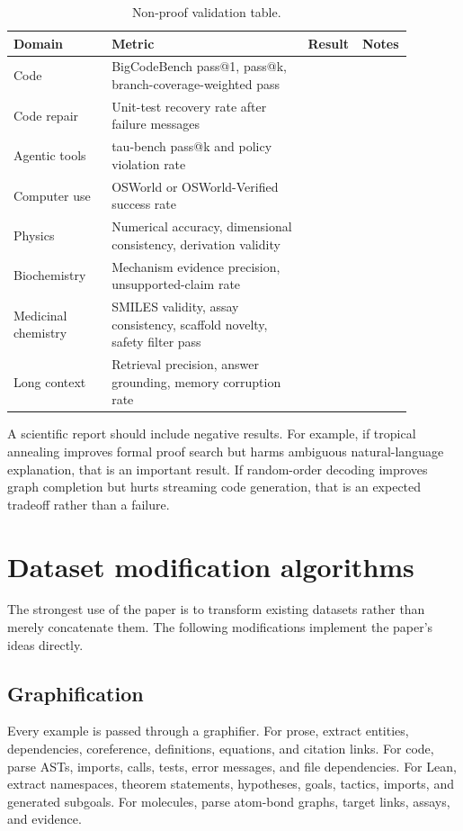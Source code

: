 \documentclass[11pt]{article}
\newcommand{\1}{\mathbf{1}}
\begin{document}
\begin{longtable}{@{}p{0.24\linewidth}p{0.48\linewidth}p{0.08\linewidth}p{0.08\linewidth}@{}}
\caption{Non-proof validation table.}\label{tab:nonproof-empty}\\
\toprule
Domain & Metric & Result & Notes\\
\midrule
Code & BigCodeBench pass@1, pass@k, branch-coverage-weighted pass & & \\
Code repair & Unit-test recovery rate after failure messages & & \\
Agentic tools & tau-bench pass@k and policy violation rate & & \\
Computer use & OSWorld or OSWorld-Verified success rate & & \\
Physics & Numerical accuracy, dimensional consistency, derivation validity & & \\
Biochemistry & Mechanism evidence precision, unsupported-claim rate & & \\
Medicinal chemistry & SMILES validity, assay consistency, scaffold novelty, safety filter pass & & \\
Long context & Retrieval precision, answer grounding, memory corruption rate & & \\
\bottomrule
\end{longtable}

A scientific report should include negative results. For example, if tropical annealing improves formal proof search but harms ambiguous natural-language explanation, that is an important result. If random-order decoding improves graph completion but hurts streaming code generation, that is an expected tradeoff rather than a failure.

\section{Dataset modification algorithms}
\label{sec:dataset-modifications}

The strongest use of the paper is to transform existing datasets rather than merely concatenate them. The following modifications implement the paper's ideas directly.

\subsection{Graphification}

Every example is passed through a graphifier. For prose, extract entities, dependencies, coreference, definitions, equations, and citation links. For code, parse ASTs, imports, calls, tests, error messages, and file dependencies. For Lean, extract namespaces, theorem statements, hypotheses, goals, tactics, imports, and generated subgoals. For molecules, parse atom-bond graphs, target links, assays, and evidence.
\end{document}
